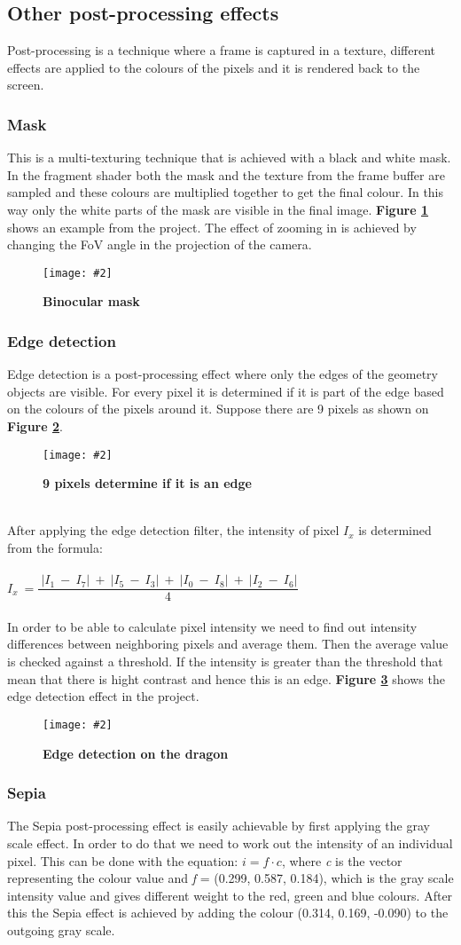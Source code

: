 \documentclass[10pt, a4paper]{article}
\newcommand{\figuremacro}[5]{
    \begin{figure}[#1]
        \centering
        \texttt{[image: \#2]}
        \caption[#3]{\textbf{#3}#4}
        \label{fig:#2}
    \end{figure}
}
\begin{document}
	\subsection{Other post-processing effects}
	Post-processing is a technique where a frame is captured in a texture, different effects are applied to the colours of the pixels and it is rendered back to the screen.
	\subsubsection{Mask}
	This is a multi-texturing technique that is achieved with a black and white mask. In the fragment shader both the mask and the texture from the frame buffer are sampled and these colours are multiplied together to get the final colour. In this way only the white parts of the mask are visible in the final image. \textbf{Figure {\ref{fig:maskEffect}}} shows an example from the project. The effect of zooming in is achieved by changing the FoV angle in the projection of the camera.
	\figuremacro{h}{maskEffect}{Binocular mask}{ }{0.9}
	\subsubsection{Edge detection}
	Edge detection is a post-processing effect where only the edges of the geometry objects are visible. For every pixel it is determined if it is part of the edge based on the colours of the pixels around it. Suppose there are 9 pixels as 
	shown on \textbf{Figure {\ref{fig:edgeDetectionMatrix}}}. 
	\figuremacro{h}{edgeDetectionMatrix}{9 pixels determine if it is an edge}{ }{0.5}
	\\After applying the edge detection filter, the intensity of pixel $I_{x}$ is determined from the formula: \\\\
	$I_{x}~=\dfrac{~|I_{1}~-~I_{7}|~+~|I_{5}~-~I_{3}|~+~|I_{0}~-~I_{8}|~+~|I_{2}~-~I_{6}|}{4}$~
	\\\\ In order to be able to calculate pixel intensity we need to find out intensity differences between neighboring pixels and average them. Then the average value is checked against a threshold. If the intensity is greater than the threshold that mean that there is hight contrast and hence this is an edge. \textbf{Figure {\ref{fig:edgeDetection}}} shows the edge detection effect in the project.
	\figuremacro{h}{edgeDetection}{Edge detection on the dragon}{ }{0.5}
	\subsubsection{Sepia}
	The Sepia post-processing effect is easily achievable by first applying the gray scale effect. In order to do that we need to work out the intensity of an individual pixel. This can be done with the equation: $i = f \cdot c$, where \textit{c} is the vector representing the colour value and \textit{f} = (0.299, 0.587, 0.184), which is the gray scale intensity value and gives different weight to the red, green and blue colours. After this the Sepia effect is achieved by adding the colour (0.314, 0.169, -0.090) to the outgoing gray scale.
\end{document}
